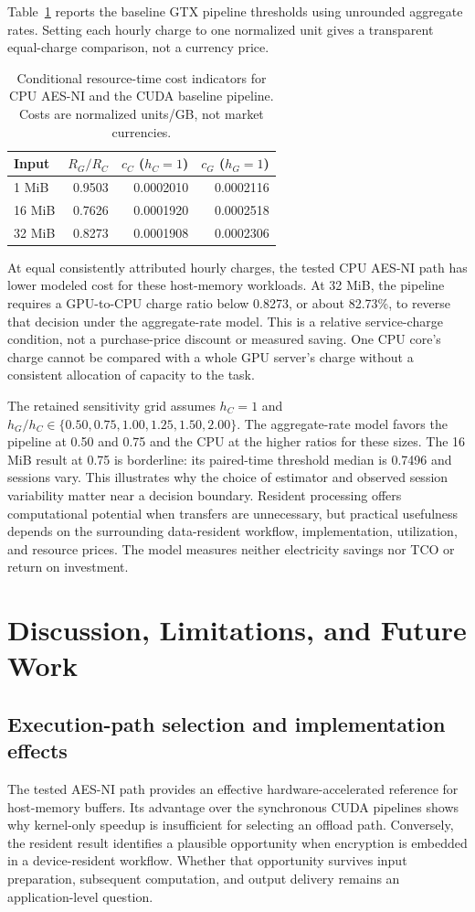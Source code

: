 \documentclass[11pt,a4paper]{article}
\begin{document}
Table~\ref{tab:econ} reports the baseline GTX pipeline thresholds using unrounded aggregate rates. Setting each hourly charge to one normalized unit gives a transparent equal-charge comparison, not a currency price.

\begin{table}[htbp]\centering\small
\caption{Conditional resource-time cost indicators for CPU AES-NI and the CUDA baseline pipeline. Costs are normalized units/GB, not market currencies.}\label{tab:econ}
\begin{tabular}{lrrr}\toprule
Input & $R_G/R_C$ & $c_C$ ($h_C=1$) & $c_G$ ($h_G=1$)\\\midrule
1 MiB & 0.9503 & 0.0002010 & 0.0002116\\
16 MiB & 0.7626 & 0.0001920 & 0.0002518\\
32 MiB & 0.8273 & 0.0001908 & 0.0002306\\\bottomrule
\end{tabular}
\end{table}

At equal consistently attributed hourly charges, the tested CPU AES-NI path has lower modeled cost for these host-memory workloads. At 32 MiB, the pipeline requires a GPU-to-CPU charge ratio below 0.8273, or about 82.73\%, to reverse that decision under the aggregate-rate model. This is a relative service-charge condition, not a purchase-price discount or measured saving. One CPU core's charge cannot be compared with a whole GPU server's charge without a consistent allocation of capacity to the task.

The retained sensitivity grid assumes $h_C=1$ and $h_G/h_C\in\{0.50,0.75,1.00,1.25,1.50,2.00\}$. The aggregate-rate model favors the pipeline at 0.50 and 0.75 and the CPU at the higher ratios for these sizes. The 16 MiB result at 0.75 is borderline: its paired-time threshold median is 0.7496 and sessions vary. This illustrates why the choice of estimator and observed session variability matter near a decision boundary. Resident processing offers computational potential when transfers are unnecessary, but practical usefulness depends on the surrounding data-resident workflow, implementation, utilization, and resource prices. The model measures neither electricity savings nor TCO or return on investment.

\section{Discussion, Limitations, and Future Work}
\subsection{Execution-path selection and implementation effects}
The tested AES-NI path provides an effective hardware-accelerated reference for host-memory buffers. Its advantage over the synchronous CUDA pipelines shows why kernel-only speedup is insufficient for selecting an offload path. Conversely, the resident result identifies a plausible opportunity when encryption is embedded in a device-resident workflow. Whether that opportunity survives input preparation, subsequent computation, and output delivery remains an application-level question.
\end{document}
